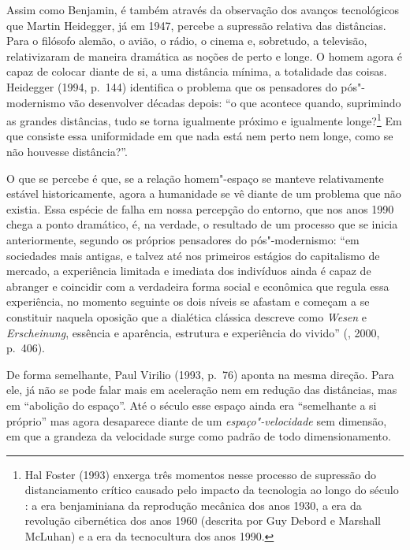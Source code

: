 Assim como Benjamin, é também através da observação dos avanços
tecnológicos que Martin Heidegger, já em 1947, percebe a supressão
relativa das distâncias. Para o filósofo alemão, o avião, o rádio, o
cinema e, sobretudo, a televisão, relativizaram de maneira dramática as
noções de perto e longe. O homem agora é capaz de colocar diante de si,
a uma distância mínima, a totalidade das coisas. Heidegger (1994, p.~144) identifica o problema que os pensadores do pós"-modernismo vão
desenvolver décadas depois: ``o que acontece quando, suprimindo as
grandes distâncias, tudo se torna igualmente próximo e igualmente longe?\footnote{Hal Foster (1993) enxerga três momentos nesse processo de
  supressão do distanciamento crítico causado pelo impacto da tecnologia
  ao longo do século : a era benjaminiana da reprodução mecânica dos
  anos 1930, a era da revolução cibernética dos anos 1960 (descrita por
  Guy Debord e Marshall McLuhan) e a era da tecnocultura dos anos 1990.}
Em que consiste essa uniformidade em que nada está nem perto nem longe,
como se não houvesse distância?''.

O que se percebe é que, se a relação homem"-espaço se manteve
relativamente estável historicamente, agora a humanidade se vê diante de
um problema que não existia. Essa espécie de falha em nossa percepção do
entorno, que nos anos 1990 chega a ponto dramático, é, na verdade, o
resultado de um processo que se inicia anteriormente, segundo os
próprios pensadores do pós"-modernismo: ``em sociedades mais antigas, e
talvez até nos primeiros estágios do capitalismo de mercado, a
experiência limitada e imediata dos indivíduos ainda é capaz de abranger
e coincidir com a verdadeira forma social e econômica que regula essa
experiência, no momento seguinte os dois níveis se afastam e começam a
se constituir naquela oposição que a dialética clássica descreve como
\emph{Wesen} e \emph{Erscheinung}, essência e aparência, estrutura e
experiência do vivido'' (, 2000, p.~406).

De forma semelhante, Paul Virilio (1993, p.~76) aponta na mesma direção.
Para ele, já não se pode falar mais em aceleração nem em redução das
distâncias, mas em ``abolição do espaço''. Até o século  esse espaço
ainda era ``semelhante a si próprio'' mas agora desaparece diante de um
\emph{espaço"-velocidade} sem dimensão, em que a grandeza da velocidade
surge como padrão de todo dimensionamento.

